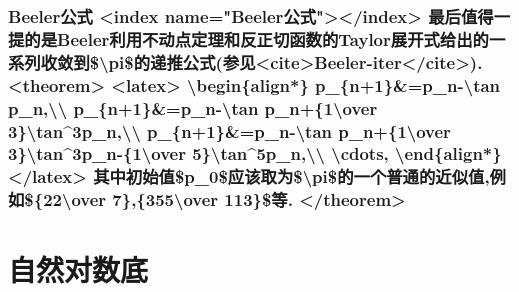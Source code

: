 \documentclass[
]{article}
\begin{document}
\hypertarget{beelerux516cux5f0f-index-namebeelerux516cux5f0findex-ux6700ux540eux503cux5f97ux4e00ux63d0ux7684ux662fbeelerux5229ux7528ux4e0dux52a8ux70b9ux5b9aux7406ux548cux53cdux6b63ux5207ux51fdux6570ux7684taylorux5c55ux5f00ux5f0fux7ed9ux51faux7684ux4e00ux7cfbux5217ux6536ux655bux5230piux7684ux9012ux63a8ux516cux5f0fux53c2ux89c1citebeeler-itercite.-theorem-latex-beginalign-p_n1p_n-tan-p_n-p_n1p_n-tan-p_n1over-3tan3p_n-p_n1p_n-tan-p_n1over-3tan3p_n-1over-5tan5p_n-cdots-endalign-latex-ux5176ux4e2dux521dux59cbux503cp_0ux5e94ux8be5ux53d6ux4e3apiux7684ux4e00ux4e2aux666eux901aux7684ux8fd1ux4f3cux503cux4f8bux598222over-7355over-113ux7b49.-theorem}{%
\subsubsection{Beeler公式 \textless index
name="Beeler公式"\textgreater\textless/index\textgreater{}
最后值得一提的是Beeler利用不动点定理和反正切函数的Taylor展开式给出的一系列收敛到\$\textbackslash pi\$的递推公式(参见\textless cite\textgreater Beeler-iter\textless/cite\textgreater).
\textless theorem\textgreater{} \textless latex\textgreater{}
\textbackslash begin\{align*\} p\_\{n+1\}\&=p\_n-\textbackslash tan
p\_n,\textbackslash\textbackslash{} p\_\{n+1\}\&=p\_n-\textbackslash tan
p\_n+\{1\textbackslash over
3\}\textbackslash tan\^{}3p\_n,\textbackslash\textbackslash{}
p\_\{n+1\}\&=p\_n-\textbackslash tan p\_n+\{1\textbackslash over
3\}\textbackslash tan\^{}3p\_n-\{1\textbackslash over
5\}\textbackslash tan\^{}5p\_n,\textbackslash\textbackslash{}
\textbackslash cdots, \textbackslash end\{align*\}
\textless/latex\textgreater{}
其中初始值\$p\_0\$应该取为\$\textbackslash pi\$的一个普通的近似值,例如\$\{22\textbackslash over
7\},\{355\textbackslash over 113\}\$等.
\textless/theorem\textgreater{}}\label{beelerux516cux5f0f-index-namebeelerux516cux5f0findex-ux6700ux540eux503cux5f97ux4e00ux63d0ux7684ux662fbeelerux5229ux7528ux4e0dux52a8ux70b9ux5b9aux7406ux548cux53cdux6b63ux5207ux51fdux6570ux7684taylorux5c55ux5f00ux5f0fux7ed9ux51faux7684ux4e00ux7cfbux5217ux6536ux655bux5230piux7684ux9012ux63a8ux516cux5f0fux53c2ux89c1citebeeler-itercite.-theorem-latex-beginalign-p_n1p_n-tan-p_n-p_n1p_n-tan-p_n1over-3tan3p_n-p_n1p_n-tan-p_n1over-3tan3p_n-1over-5tan5p_n-cdots-endalign-latex-ux5176ux4e2dux521dux59cbux503cp_0ux5e94ux8be5ux53d6ux4e3apiux7684ux4e00ux4e2aux666eux901aux7684ux8fd1ux4f3cux503cux4f8bux598222over-7355over-113ux7b49.-theorem}}

\hypertarget{ux81eaux7136ux5bf9ux6570ux5e95}{%
\section{自然对数底}\label{ux81eaux7136ux5bf9ux6570ux5e95}}
\end{document}
